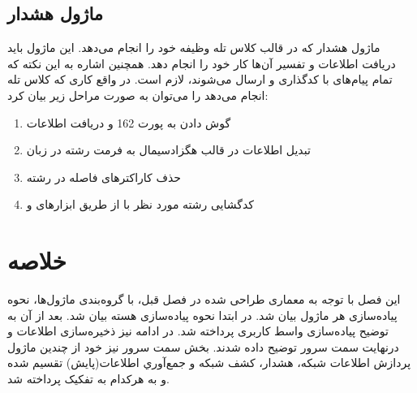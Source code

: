 \subsection{ماژول هشدار}

ماژول هشدار که در قالب کلاس تله وظیفه خود را انجام می‌دهد. این ماژول باید دریافت اطلاعات و تفسیر آن‌ها کار خود را انجام دهد. همچنین اشاره به این نکته که تمام پیام‌های  با  کدگذاری و ارسال می‌شوند، لازم است. در واقع کاری که کلاس تله انجام می‌دهد را می‌توان به صورت مراحل زیر بیان کرد:

\begin{enumerate}
    \item گوش دادن به پورت 162 و دریافت اطلاعات
    \item تبدیل اطلاعات در قالب هگزادسیمال به فرمت رشته در زبان 
    \item حذف کاراکترهای فاصله در رشته
    \item کدگشایی رشته مورد نظر با  از طریق ابزارهای  و 

\end{enumerate}


\section{خلاصه}

این فصل با توجه به معماری طراحی شده در فصل قبل، با گروه‌بندی ماژول‌ها، نحوه پیاده‌سازی هر ماژول بیان شد. در ابتدا نحوه پیاده‌سازی هسته  بیان شد. بعد از آن به توضیح پیاده‌سازی واسط کاربری پرداخته شد. در ادامه نیز ذخیره‌سازی اطلاعات و درنهایت سمت سرور توضیح داده شدند. بخش سمت سرور نیز خود از چندین ماژول پردازش اطلاعات شبکه، هشدار، کشف شبکه و جمع‌آوري اطلاعات(پایش) تقسیم شده و به هرکدام به تفکیک پرداخته شد.